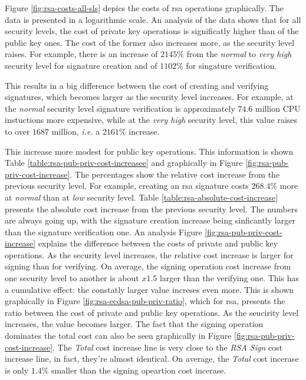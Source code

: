 \documentclass{llncs}
\begin{document}
Figure \ref{fig:rsa-costs-all-sls} depics the costs of \gls{rsa} operations graphically. The data is presented in a logarithmic
scale. An analysis of the data shows that for all security levels, the cost of private key operations is significatly higher than
of the public key ones. The cost of the former also increases more, as the security level raises. For example, there is an increase
of $2145\%$ from the \textit{normal} to \textit{very high} security level for signature creation and of $1102\%$ for singature verification.

This results in a big difference between the cost of creating and verifying signatures, which becomes larger as the security level increases. 
For example,
at the \textit{normal} security level signature verification is approximately $74.6$ million CPU instuctions more expensive,
while at the \textit{very high} security level, this value raises to over $1687$ million, \textit{i.e.} a $2161\%$ increase.

This increase more modest for public key operations. This information is shown Table \ref{table:rsa-pub-priv-cost-increasee} and graphically 
in Figure \ref{fig:rsa-pub-priv-cost-increase}. 
The percentages show the relative cost increase from the previous security level. For example, creating an \gls{rsa} signature costs 
$268.4\%$ more at \textit{normal} than at \textit{low} security level. Table \ref{table:rsa-absolute-cost-increase} presents the absolute cost
increase from the previous security level. The numbers are always going up, with the signature creation increase being sinficantly larger 
than the signature verification one. An analysis Figure \ref{fig:rsa-pub-priv-cost-increase}
explains the difference between the costs of private and public key operations. As the security level increases, the relative cost
increase is larger for signing than for verifying. On average, the signing operation cost increase from one security level to another 
is about $x1.5$ larger than the verifying one. This has a cumulative effect: the constatly larger value increses even more. 
This is shown graphically in Figure \ref{fig:rsa-ecdsa-pub-priv-ratio}, which for \gls{rsa}, presents the ratio between the cost of private and 
public key operations. As the seucirity level increases, the value becomes larger. The fact that the signing operation dominates the total cost
can also be seen graphically in Figure \ref{fig:rsa-pub-priv-cost-increase}. The \textit{Total} cost increase line is very close to the 
\textit{RSA Sign} cost increase line, in fact, they're almost identical. On average, the \textit{Total} cost incerase is only $1.4\%$ smaller
than the signing opeartion cost incerase.
\end{document}
